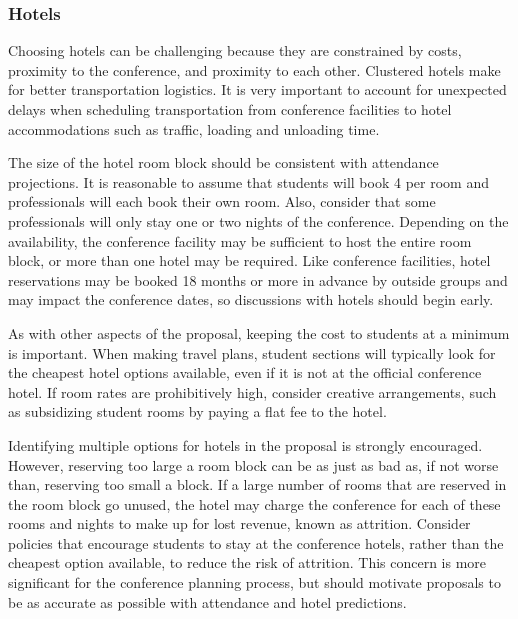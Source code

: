 \documentclass[12pt]{article}
\begin{document}
\subsubsection{Hotels}
Choosing hotels can be challenging because they are constrained by costs, proximity to
the conference, and proximity to each other. Clustered hotels make for better
transportation logistics. It is very important to account for unexpected delays when scheduling transportation from conference facilities to hotel accommodations such as traffic, loading and unloading time.

The size of the hotel room block should be consistent with attendance projections.
It is reasonable to assume that students will book 4 per room and professionals will each book their own room.
Also, consider that some professionals will only stay one or two nights of the conference.
Depending on the availability, the conference facility may be sufficient to host the entire room block, or more than one hotel may be required.
Like conference facilities, hotel reservations may be booked 18 months or more in advance by outside groups and may impact the conference dates, so discussions with hotels should begin early. 

As with other aspects of the proposal, keeping the cost to students at a minimum is important.
When making travel plans, student sections will typically look for the cheapest hotel options available, even if it is not at the official conference hotel.
If room rates are prohibitively high, consider creative arrangements, such as subsidizing student rooms by paying a flat fee to the hotel.

Identifying multiple options for hotels in the proposal is strongly encouraged.
However, reserving too large a room block can be as just as bad as, if not worse than, reserving too small a block. If a large number of rooms that are reserved in the room block go unused, the hotel may charge the conference for each of these rooms and nights to make up for lost revenue, known as attrition.
Consider policies that encourage students to stay at the conference hotels, rather than the cheapest option available, to reduce the risk of attrition.
This concern is more significant for the conference planning process, but should motivate proposals to be as accurate as possible with attendance and hotel predictions.
\end{document}
